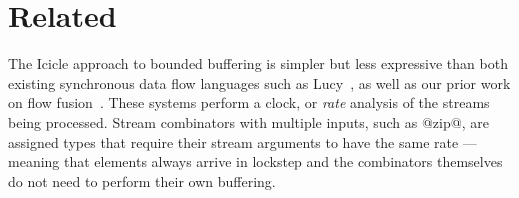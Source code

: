 \section{Related}
\label{s:Related}

The Icicle approach to bounded buffering is simpler but less expressive than both existing synchronous data flow languages such as Lucy~\cite{mandel2010lucy}, as well as our prior work on flow fusion~\cite{lippmeier2013data}. These systems perform a clock, or \emph{rate} analysis of the streams being processed. Stream combinators with multiple inputs, such as @zip@, are assigned types that require their stream arguments to have the same rate --- meaning that elements always arrive in lockstep and the combinators themselves do not need to perform their own buffering.





